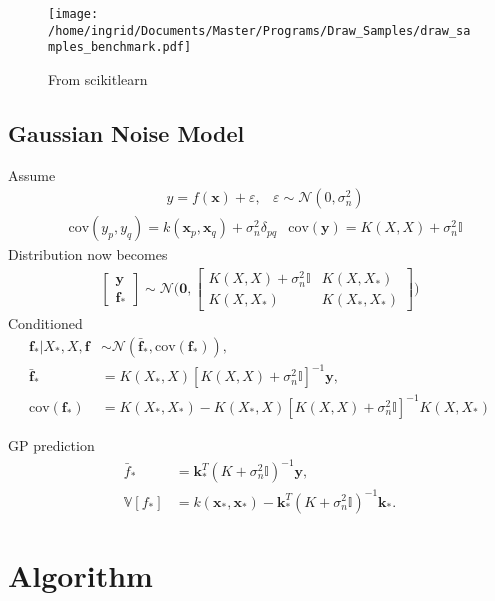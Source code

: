 \documentclass[twoside,english]{uiofysmaster}
\begin{document}
\begin{figure}
\centering
\texttt{[image: /home/ingrid/Documents/Master/Programs/Draw\_Samples/draw\_samples\_benchmark.pdf]}
\caption{From scikitlearn}
\end{figure}


\subsection{Gaussian Noise Model}

Assume
\begin{align}
&y = f(\textbf{x}) + \varepsilon, &\varepsilon \sim \mathcal{N}(0, \sigma_n^2)
\end{align}
\begin{align}
&\text{cov}(y_p, y_q) = k(\textbf{x}_p, \textbf{x}_q) + \sigma_n^2 \delta_{pq} &\text{cov}(\textbf{y}) = K(X, X) + \sigma_n^2 \mathbb{I}
\end{align}
Distribution now becomes
\begin{align}
\begin{bmatrix}
\textbf{y}\\
\textbf{f}_*
\end{bmatrix}
\sim 
\mathcal{N} \Bigg(
\boldsymbol{0},
\begin{bmatrix}
K(X, X) + \sigma_n^2 \mathbb{I} & K(X, X_*)\\
K(X, X_*) & K(X_*, X_*)
\end{bmatrix}
 \Bigg)
\end{align}
Conditioned
\begin{align}
\textbf{f}_* \big| X_*, X, \textbf{f} &\sim \mathcal{N}(\bar{\textbf{f}}_*, \text{cov}(\textbf{f}_*)),\\
\bar{\textbf{f}}_* &= K(X_*, X) [K(X, X) + \sigma_n^2 \mathbb{I}]^{-1} \textbf{y},\\
\text{cov} (\textbf{f}_*) &= K(X_*, X_*) - K(X_*, X)[K(X, X) + \sigma_n^2 \mathbb{I}]^{-1} K(X, X_*)
\end{align}

GP prediction
\begin{align}
\bar{f}_* &= \textbf{k}_*^T(K + \sigma_n^2\mathbb{I})^{-1} \textbf{y},\label{1}\\
\mathbb{V}[f_*] &= k(\textbf{x}_*, \textbf{x}_*) - \textbf{k}_*^T(K + \sigma_n^2 \mathbb{I})^{-1} \textbf{k}_*.
\end{align}

\section{Algorithm}
\end{document}
